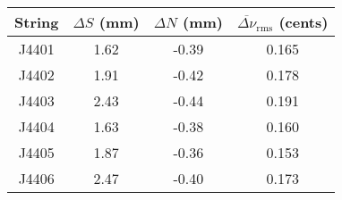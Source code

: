 \begin{tabular}{cccc}
\toprule
String & $\Delta S$ (mm) & $\Delta N$ (mm) & $\overline{\Delta \nu}_\text{rms}$ (cents) \\
\midrule
J4401 & 1.62 & -0.39 & 0.165 \\
J4402 & 1.91 & -0.42 & 0.178 \\
J4403 & 2.43 & -0.44 & 0.191 \\
J4404 & 1.63 & -0.38 & 0.160 \\
J4405 & 1.87 & -0.36 & 0.153 \\
J4406 & 2.47 & -0.40 & 0.173 \\
\bottomrule
\end{tabular}

